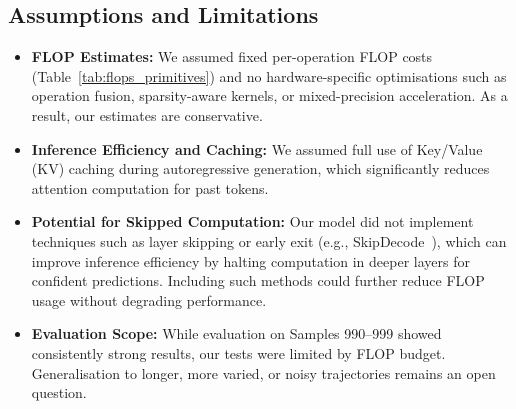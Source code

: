\documentclass[a4paper,12pt]{article}
\begin{document}
  
  \subsection*{Assumptions and Limitations}
  
  \begin{itemize}
    \item \textbf{FLOP Estimates:} We assumed fixed per-operation FLOP costs (Table~\ref{tab:flops_primitives}) and no hardware-specific optimisations such as operation fusion, sparsity-aware kernels, or mixed-precision acceleration. As a result, our estimates are conservative.
  
    \item \textbf{Inference Efficiency and Caching:} We assumed full use of Key/Value (KV) caching during autoregressive generation, which significantly reduces attention computation for past tokens.
  
    \item \textbf{Potential for Skipped Computation:} Our model did not implement techniques such as layer skipping or early exit (e.g., SkipDecode~\cite{delcorro2023skipdecode}), which can improve inference efficiency by halting computation in deeper layers for confident predictions. Including such methods could further reduce FLOP usage without degrading performance.
  
    \item \textbf{Evaluation Scope:} While evaluation on Samples 990–999 showed consistently strong results, our tests were limited by FLOP budget. Generalisation to longer, more varied, or noisy trajectories remains an open question.
  \end{itemize}
  
\end{document}
